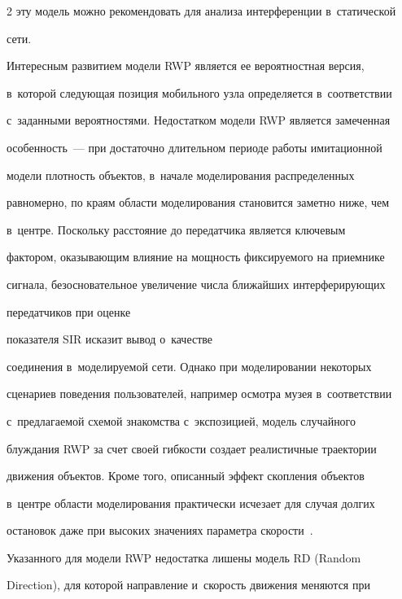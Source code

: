 \begin{multicols}{2}
эту модель мож\-но рекомендовать для анализа интерференции в~статической 

сети. 



Интересным развитием модели RWP является ее вероятностная версия, 

в~которой следующая позиция мобильного узла определяется в~соответствии 

с~заданными вероятностями. Недостатком модели RWP является замеченная 

осо\-бен\-ность~--- при достаточно длительном периоде работы имитационной 

модели плот\-ность объектов, в~начале моделирования распределенных 

равномерно, по краям об\-ласти моделирования становится заметно ниже, чем 

в~цент\-ре. Поскольку рас\-сто\-яние до передатчика является клю\-че\-вым 

фактором, оказывающим вли\-яние на мощ\-ность фик\-си\-ру\-емо\-го на приемнике 

сигнала, безосновательное увеличение чис\-ла ближайших интерферирующих 

передатчиков при оценке\linebreak

 показателя SIR исказит вывод о~качестве 

со\-еди\-не\-ния в~мо\-де\-ли\-ру\-емой сети. Однако при моделировании некоторых 

сценариев поведения пользователей, например осмот\-ра музея в~соответствии\linebreak 

с~пред\-ла\-га\-емой схемой знакомства с~экспозицией, модель случайного 

блуж\-да\-ния RWP за счет своей гиб\-кости создает реалистичные траектории 

движения объектов. Кроме того, описанный эффект скопления объектов 

в~цент\-ре об\-ласти моделирования практически исчезает для случая дол\-гих 

остановок даже при высоких значениях па\-ра\-мет\-ра ско\-рости~\cite{10-sg}.





  Указанного для модели RWP недостатка лишены модель RD (Random 

Direction), для которой на\-прав\-ле\-ние и~ско\-рость движения меняются при 


\end{multicols}
